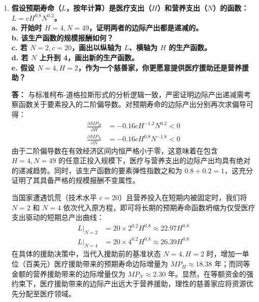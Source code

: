 \begin{enumerate}[label=\textbf{\arabic*.}, leftmargin=*]
		\textbf{答：}
		严密证明边际产出递减需验证产出函数关于要素投入的二阶偏导数性质。根据原生产函数，劳动与资本的边际产出函数及其导数分别为：
		\[
		\begin{aligned}
			MP_L &= 20K^{0.8}L^{-0.8} \implies \frac{\partial MP_L}{\partial L} = -16K^{0.8}L^{-1.8} < 0 \\
			MP_K &= 80K^{-0.2}L^{0.2} \implies \frac{\partial MP_K}{\partial K} = -16K^{-1.2}L^{0.2} < 0
		\end{aligned}
		\]
		由于二阶偏导数在定义域内恒小于零，这证明了边际产出递减是该柯布-道格拉斯生产函数的内在数学属性，并不依赖于具体的初始投入值。因此，当 $K=4, L=49$ 时，随着任何单一要素投入的增加，其相应的边际产出必然下降。在规模报酬判定方面，令所有要素投入同比例扩大 $\lambda$ 倍（$\lambda > 1$）：
		\[ f(\lambda K, \lambda L) = 100(\lambda K)^{0.8}(\lambda L)^{0.2} = \lambda^{0.8+0.2} (100K^{0.8}L^{0.2}) = \lambda q \]
		结果显示产出与要素投入同比例增长，故该生产函数呈现严格的规模报酬不变特性。
		
		\item\textbf{假设预期寿命（$L$，按年计算）是医疗支出（$H$）和营养支出（$N$）的函数：$L=cH^{0.8}N^{0.2}$。\\
			a. 开始时 $H=4, N=49$，证明两者的边际产出都是递减的。\\
			b. 该生产函数的规模报酬如何？\\
			c. 若 $N=2, c=20$，画出以纵轴为 $L$、横轴为 $H$ 的生产函数。\\
			d. 若 $N$ 上升到 4，画出新的生产函数。\\
			e. 假设 $N=4, H=2$，作为一个慈善家，你更愿意提供医疗援助还是营养援助？}
		
		\textbf{答：}
		与标准柯布-道格拉斯形式的分析逻辑一致，严密证明边际产出递减需考察函数关于要素投入的二阶偏导数。对预期寿命的边际产出分别再次求偏导可得：
		\[
		\begin{aligned}
			\frac{\partial MP_H}{\partial H} &= -0.16 c H^{-1.2} N^{0.2} < 0 \\
			\frac{\partial MP_N}{\partial N} &= -0.16 c H^{0.8} N^{-1.8} < 0
		\end{aligned}
		\]
		由于二阶偏导数在有效经济区间内恒严格小于零，这意味着在包含 $H=4, N=49$ 的任意正投入规模下，医疗与营养支出的边际产出均具有绝对的递减趋势。同时，该生产函数的要素弹性指数之和为 $0.8 + 0.2 = 1$，这充分证明了其具备严格的规模报酬不变属性。
		
		当国家遭遇饥荒（技术水平 $c=20$）且营养投入在短期内被固定时，我们将 $N=2$ 和 $N=4$ 依次代入原方程，即可将长期的预期寿命函数坍缩为仅受医疗支出驱动的短期总产出曲线：
		\[
		\begin{aligned}
			L|_{N=2} &= 20 \times 2^{0.2} H^{0.8} \approx 22.97 H^{0.8} \\
			L|_{N=4} &= 20 \times 4^{0.2} H^{0.8} \approx 26.39 H^{0.8}
		\end{aligned}
		\]
		在具体的援助决策中，当代入援助前的基准状态 $N=4, H=2$ 时，增加一单位（百美元）医疗援助带来的预期寿命边际增量为 $MP_H \approx 18.38$ 年；而同等金额的营养援助带来的边际增量仅为 $MP_N \approx 2.30$ 年。显然，在等额资金的强约束下，医疗援助带来的边际产出远大于营养援助，理性的慈善家应将资源优先分配至医疗领域。
		

\end{enumerate}
